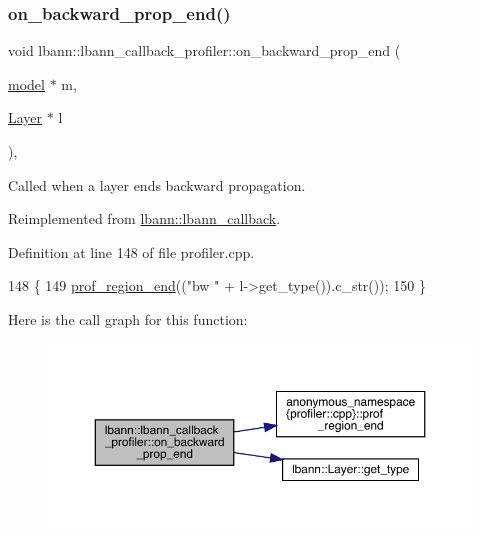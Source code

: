 \subsubsection{\texorpdfstring{on\+\_\+backward\+\_\+prop\+\_\+end()}{on\_backward\_prop\_end()}\hspace{0.1cm}{\footnotesize\ttfamily [2/2]}}
{\footnotesize\ttfamily void lbann\+::lbann\+\_\+callback\+\_\+profiler\+::on\+\_\+backward\+\_\+prop\+\_\+end (\begin{DoxyParamCaption}\item[{\hyperlink{classlbann_1_1model}{model} $\ast$}]{m,  }\item[{\hyperlink{classlbann_1_1Layer}{Layer} $\ast$}]{l }\end{DoxyParamCaption})\hspace{0.3cm}{\ttfamily [override]}, {\ttfamily [virtual]}}

Called when a layer ends backward propagation. 

Reimplemented from \hyperlink{classlbann_1_1lbann__callback_aba03b59c056ace8094095c08e39b9ac4}{lbann\+::lbann\+\_\+callback}.



Definition at line 148 of file profiler.\+cpp.


\begin{DoxyCode}
148                                                                      \{
149   \hyperlink{namespaceanonymous__namespace_02profiler_8cpp_03_a7984c26fb186307873a2f83f91715a99}{prof\_region\_end}((\textcolor{stringliteral}{"bw "} + l->get\_type()).c\_str());
150 \}
\end{DoxyCode}
Here is the call graph for this function\+:\nopagebreak
\begin{figure}[H]
\begin{center}
\leavevmode
\includegraphics[width=350pt]{classlbann_1_1lbann__callback__profiler_a3fe2bc2b07b2e8e5873c9afb94cebe93_cgraph}
\end{center}
\end{figure}
\mbox{\label{classlbann_1_1lbann__callback__profiler_a4a60f7470bf36c6833862d47d1a7ce01}} 
